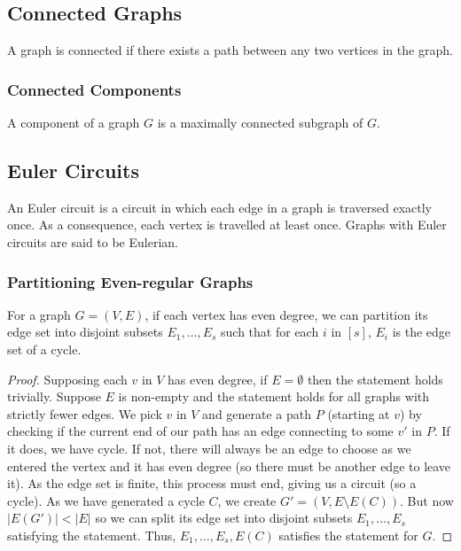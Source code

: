 \subsection{Connected Graphs}

A graph is connected if there exists a path between any two vertices 
in the graph.

\subsubsection{Connected Components}

A component of a graph $G$ is a maximally connected subgraph of $G$.

\subsection{Euler Circuits}

An Euler circuit is a circuit in which each edge in a graph is
traversed exactly once. As a consequence, each vertex is travelled 
at least once. Graphs with Euler circuits are said to be Eulerian.

\newpage

\subsubsection{Partitioning Even-regular Graphs} \label{eulerpart}

For a graph $G = (V, E)$, if each vertex has even degree, we can
partition its edge set into disjoint subsets $E_1, \ldots, E_s$
such that for each $i$ in $[s]$, $E_i$ is the edge set of a cycle.
\begin{proof}
    Supposing each $v$ in $V$ has even degree, if $E = \emptyset$ then
    the statement holds trivially. Suppose $E$ is non-empty and the
    statement holds for all graphs with strictly fewer edges. We
    pick $v$ in $V$ and generate a path $P$ (starting at $v$) 
    by checking if the current end of our path has an edge connecting 
    to some $v'$ in $P$. If it does, we have cycle. If not, there will 
    always be an edge to choose as we entered the vertex and it has even degree 
    (so there must be another edge to leave it). As the edge set is finite,
    this process must end, giving us a circuit (so a cycle). As we
    have generated a cycle $C$, we create $G' = (V, E \setminus E(C))$. 
    But now $|E(G')| < |E|$ so we can split its edge set into
    disjoint subsets $E_1, \ldots, E_s$ satisfying the statement.
    Thus, $E_1, \ldots, E_s, E(C)$ satisfies the statement for $G$.
\end{proof}

